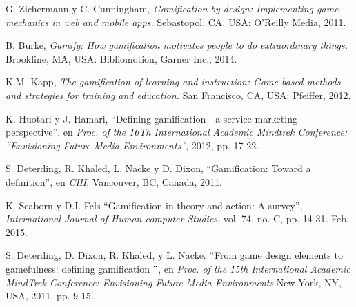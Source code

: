 
\begin{thebibliography}{9}

        G. Zichermann y C. Cunningham,
        {\it Gamification by design: Implementing game mechanics in web and mobile apps.}
        Sebastopol, CA, USA: O'Reilly Media, 2011.
        
        B. Burke,
        {\it Gamify: How gamification motivates people to do extraordinary things.}
        Brookline, MA, USA: Bibliomotion, Garner Inc., 2014.
        
        K.M. Kapp,
        {\it The gamification of learning and instruction: Game-based methods and strategies for training and education.}
        San Francisco, CA, USA: Pfeiffer, 2012.
        
        K. Huotari y J. Hamari,
        ``Defining gamification - a service marketing perspective'', en
        {\it Proc. of the 16Th International Academic Mindtrek Conference: ``Envisioning Future Media Environments''},
        2012, pp. 17-22.
    
        S. Deterding, R. Khaled, L. Nacke y D. Dixon,
        ``Gamification: Toward a definition'', en
        {\it CHI}, Vancouver, BC, Canada, 2011.
        
        K. Seaborn y D.I. Fels
        ``Gamification in theory and action: A survey'',
        \textit{International Journal of Human-computer Studies}, vol. 74, no. C, pp. 14-31. Feb. 2015.
        
        S. Deterding, D. Dixon, R. Khaled, y L. Nacke.
        $"$From game design elements to gamefulness: defining gamification $"$, en \textit{ Proc. of the 15th International Academic MindTrek Conference: Envisioning Future Media Environments} New York, NY, USA, 2011, pp. 9-15. 
        
        
        

\end{thebibliography}
